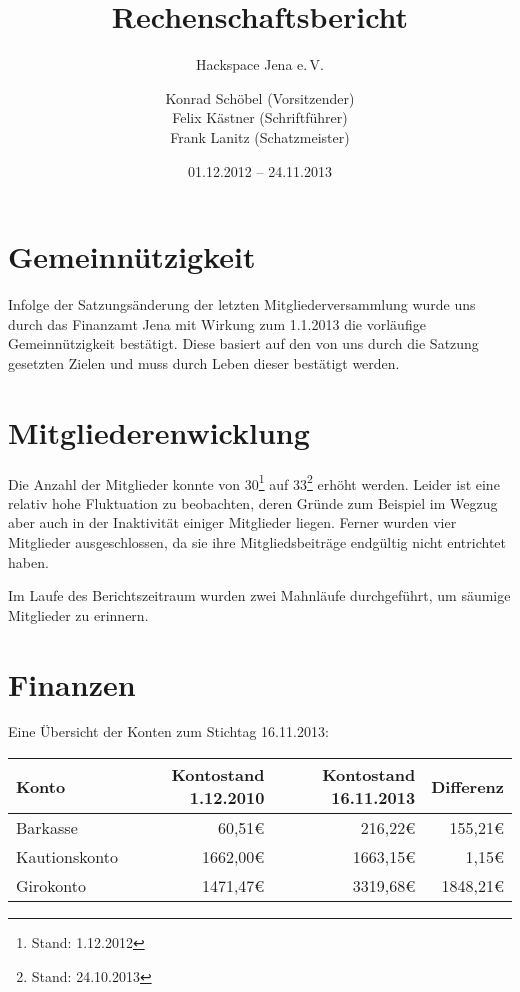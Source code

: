 \documentclass[10pt,DIV16]{scrartcl}
\title{Rechenschaftsbericht}
\subtitle{Hackspace Jena e.\,V.}
\author{%
	Konrad Schöbel (Vorsitzender)\\
    Felix Kästner (Schriftführer)\\
	Frank Lanitz (Schatzmeister)
}
\date{01.12.2012 -- 24.11.2013}
\begin{document}
\maketitle{}

\tableofcontents{}

\newpage{}

\section{Gemeinnützigkeit}

Infolge der Satzungsänderung der letzten Mitgliederversammlung wurde 
uns durch das Finanzamt Jena mit Wirkung zum 1.1.2013 die vorläufige 
Gemeinnützigkeit bestätigt. Diese basiert auf den von uns durch die 
Satzung gesetzten Zielen und muss durch Leben dieser bestätigt werden. 

\section{Mitgliederenwicklung}

Die Anzahl der Mitglieder konnte von 30\footnote{Stand: 1.12.2012} auf 
33\footnote{Stand: 24.10.2013} erhöht werden. Leider ist eine relativ 
hohe Fluktuation zu beobachten, deren Gründe zum Beispiel im Wegzug aber 
auch in der Inaktivität einiger Mitglieder liegen. Ferner wurden vier Mitglieder 
ausgeschlossen, da sie ihre Mitgliedsbeiträge endgültig nicht entrichtet 
haben.

Im Laufe des Berichtszeitraum wurden zwei Mahnläufe durchgeführt, um 
säumige Mitglieder zu erinnern. 

\section{Finanzen}

Eine Übersicht der Konten zum Stichtag 16.11.2013:

\begin{table}[h]
\begin{tabular}{l|r|r|r}
\textbf{Konto} & \textbf{Kontostand 1.12.2010} & \textbf{Kontostand 16.11.2013} & \textbf{Differenz} \\ \hline
Barkasse & 60,51\euro & 216,22\euro & 155,21\euro \\
Kautionskonto & 1662,00\euro & 1663,15\euro & 1,15\euro \\
Girokonto & 1471,47\euro & 3319,68\euro & 1848,21\euro \\ \hline
\end{tabular}
\end{table}
\end{document}
